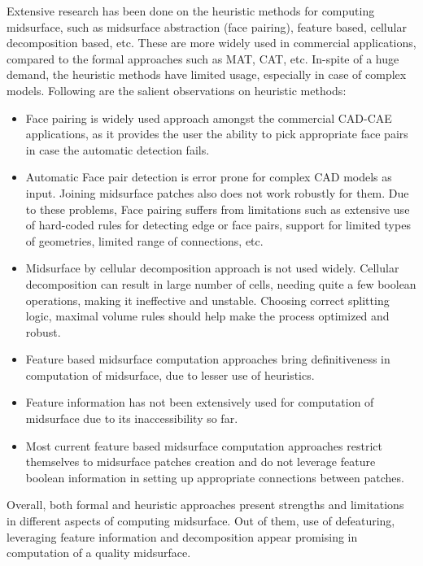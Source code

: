 Extensive research has been done on the heuristic methods for computing midsurface, such as midsurface abstraction (face pairing), feature based, cellular decomposition based, etc. These are more widely used in commercial applications, compared to the formal approaches such as MAT, CAT, etc. In-spite of a huge demand, the heuristic methods have limited usage, especially in case of complex models. Following are the salient observations on heuristic methods:

\begin{itemize}[noitemsep,topsep=2pt,parsep=2pt,partopsep=2pt]
\item Face pairing is widely used approach amongst the commercial CAD-CAE applications, as it provides the user the ability to pick appropriate face pairs in case the automatic detection fails. 
\item Automatic Face pair detection is error prone for complex CAD models as input. Joining midsurface patches also does not work robustly for them. Due to these problems, Face pairing suffers from limitations such as extensive use of hard-coded rules for detecting edge or face pairs, support for limited types of geometries, limited range of connections, etc.
\item Midsurface by cellular decomposition approach is not used widely. Cellular decomposition can result in large number of cells, needing quite a few boolean operations, making it ineffective and unstable. Choosing correct splitting logic, maximal volume rules should help make the process optimized and robust.
\item Feature based midsurface computation approaches bring definitiveness in computation of midsurface, due to lesser use of heuristics.
\item Feature information has not been extensively used for computation of midsurface due to its inaccessibility so far. 
\item Most current feature based midsurface computation approaches restrict themselves to midsurface patches creation and do not leverage feature boolean information in setting up appropriate connections between patches.
 \end{itemize}

Overall, both formal and heuristic approaches present strengths and limitations in different aspects of computing midsurface. Out of them, use of defeaturing, leveraging feature information and decomposition appear promising in computation of a quality midsurface. 

